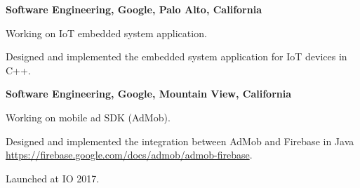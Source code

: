 

\begin{myexp}
\item \textbf{Software Engineering, Google, Palo Alto, California}
    \begin{mybullet}
    \item Working on IoT embedded system application.
      \begin{mybullet}
        \item Designed and implemented the embedded system application for
          IoT devices in C++.
      \end{mybullet}
    \end{mybullet}

\item \textbf{Software Engineering, Google, Mountain View, California}
    \begin{mybullet}
    \item Working on mobile ad SDK (AdMob).
      \begin{mybullet}
        \item Designed and implemented the integration between AdMob and
          Firebase in Java \\
          \url{https://firebase.google.com/docs/admob/admob-firebase}.
      \item Launched at IO 2017.
      \end{mybullet}
    \end{mybullet}


\end{myexp}

